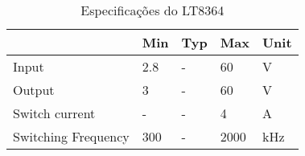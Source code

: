 \begin{table}[H]
\centering
\caption{Especificações do LT8364}
\label{lt8364_specs_table}
\begin{tabular}{|l|l|l|l|l|} 
\cline{2-5}
\multicolumn{1}{c|}{} & \multicolumn{1}{c|}{Min} & \multicolumn{1}{c|}{Typ} & \multicolumn{1}{c|}{Max} & Unit  \\ 
\hline
Input                 & 2.8                      & -                        & 60                      & V     \\ 
\hline
Output                & 3                        & -                        & 60                      & V   \\ 
\hline
Switch current                & -                        & -                        & 4                      & A   \\ 
\hline
Switching Frequency   & 300                   & -                      & 2000                        & kHz   \\
\hline
\end{tabular}
\end{table}